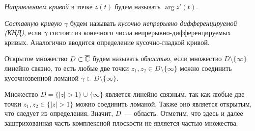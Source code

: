 \begin{definition}
\textit{Направлением кривой} в точке \(z(t)\) будем называть \(\arg{z'(t)}\).
\end{definition}

\begin{definition}
\textit{Составную кривую \(\gamma\)} будем называть \textit{кусочно непрерывно дифференцируемой
(КНД)}, если \(\gamma\) состоит из конечного числа непрерывно-дифференцируемых кривых. Аналогично
вводится определение кусочно-гладкой кривой.
\end{definition}

\begin{definition}
Открытое множество \(D \subset \overline{\mathbb{C}}\) будем называть \textit{областью}, если множество \(D \setminus
\{\infty\}\) линейно связно, то есть любые две точки \(z_1, z_2 \in D \setminus \{\infty\}\) можно
соединить кусочнозвенной ломаной \(\gamma \subset D \setminus \{\infty\}\).
\end{definition}

\begin{example}
\hfill \noindent
\par
\begin{minipage}[c]{0.45\textwidth}
    \centering
\end{minipage}
\hfill
\begin{minipage}[c]{0.5\textwidth}
Множество \(D = \{|z| > 1\} \cup \{\infty\}\) является линейно связным, так как любые две точки
\(z_1, z_2 \in \{|z| > 1\}\) можно соединить ломаной. Также оно является открытым, что следует из
определения. Значит, \(D\)~--- область. Отметим, что здесь и далее заштрихованная часть комплексной
плоскости не является частью множества.
\end{minipage}
\end{example}

